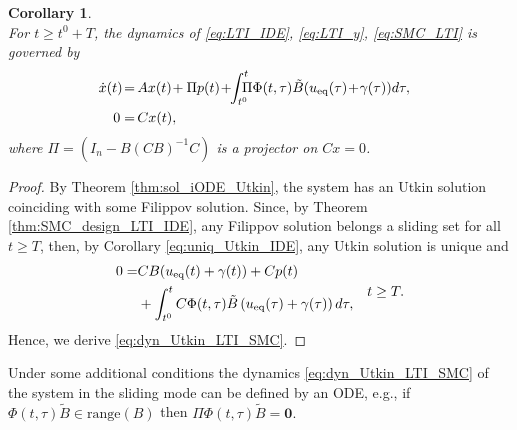 \documentclass{article}
\newcommand{\zero}{\mathbf{0}}
\newcommand{\range}{\mathrm{range}}
\newtheorem{corollary}{Corollary}
\begin{document}
\begin{corollary}
\begin{equation}
	\end{equation}	
	For $t\!\geq\! t^0\!+\!T$, the dynamics of 	\eqref{eq:LTI_IDE}, \eqref{eq:LTI_y}, \eqref{eq:SMC_LTI}   is governed by \vspace{-1mm}
	\begin{equation}\label{eq:dyn_Utkin_LTI_SMC}
\begin{split}
		\!\!\!\!\!\dot x(t)\!=&\,Ax(t)\!+\Pi p(t)
		\!+\!\!\int^t_{t^0} \!\!\!\!\Pi\Phi(t,\tau) \tilde B(u_{\rm eq}(\tau)\!+\!\gamma(\tau))d
			\tau,\\
			0=&\, Cx(t),
		\end{split} \vspace{-1mm}
	\end{equation}
{where $\Pi=\left(I_n\!-\!B(CB)^{-1}C\right)$ is a projector on $Cx=0$.}
\end{corollary} 
\begin{proof}
	By Theorem \ref{thm:sol_iODE_Utkin},  the system has an Utkin solution coinciding with some Filippov solution.  Since, by Theorem \ref{thm:SMC_design_LTI_IDE}, any Filippov solution belongs a sliding set for all $t\geq T$, then, by Corollary \ref{eq:uniq_Utkin_IDE}, any Utkin solution is unique   and \vspace{-1mm}
	\begin{equation}\label{eq:tilde_u_eq_LTI}
	\begin{split}
		0=&CB(u_{\rm eq}(t)+\gamma(t))+Cp(t)\\
		&+\int^t_{t^0}C\Phi(t,\tau)\tilde B
		\left(u_{\rm eq} (\tau)+\gamma(\tau)\right)d \tau,
	\end{split}\quad  t\geq T.\vspace{-1mm}
	\end{equation}
Hence, we derive \eqref{eq:dyn_Utkin_LTI_SMC}.
\end{proof}	

Under some additional conditions the dynamics  \eqref{eq:dyn_Utkin_LTI_SMC} of the system in the sliding mode can be defined by an ODE, e.g.,
	if  $\Phi(t,\tau) \tilde B\in \range(B)$  then 
$
		\Pi\Phi(t,\tau) \tilde B=\zero.$
\end{document}
